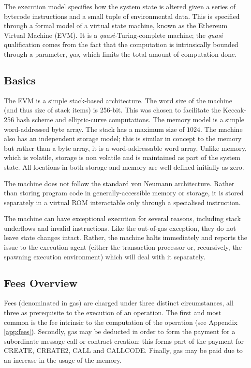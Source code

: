 \documentclass[9pt,oneside]{amsart}
\begin{document}
\begin{multicols}{2}
The execution model specifies how the system state is altered given a series of bytecode instructions and a small tuple of environmental data. This is specified through a formal model of a virtual state machine, known as the Ethereum Virtual Machine (EVM). It is a \textit{quasi-}Turing-complete machine; the \textit{quasi} qualification comes from the fact that the computation is intrinsically bounded through a parameter, \textit{gas}, which limits the total amount of computation done.

\subsection{Basics}

The EVM is a simple stack-based architecture. The word size of the machine (and thus size of stack items) is 256-bit. This was chosen to facilitate the Keccak-256 hash scheme and elliptic-curve computations. The memory model is a simple word-addressed byte array. The stack has a maximum size of $1024$. The machine also has an independent storage model; this is similar in concept to the memory but rather than a byte array, it is a word-addressable word array. Unlike memory, which is volatile, storage is non volatile and is maintained as part of the system state. All locations in both storage and memory are well-defined initially as zero.

The machine does not follow the standard von Neumann architecture. Rather than storing program code in generally-accessible memory or storage, it is stored separately in a virtual ROM interactable only through a specialised instruction.

The machine can have exceptional execution for several reasons, including stack underflows and invalid instructions. Like the out-of-gas exception, they do not leave state changes intact. Rather, the machine halts immediately and reports the issue to the execution agent (either the transaction processor or, recursively, the spawning execution environment) which will deal with it separately.

\subsection{Fees Overview}

Fees (denominated in gas) are charged under three distinct circumstances, all three as prerequisite to the execution of an operation. The first and most common is the fee intrinsic to the computation of the operation (see Appendix \ref{app:fees}). Secondly, gas may be deducted in order to form the payment for a subordinate message call or contract creation; this forms part of the payment for {\small CREATE}, {\small CREATE2}, {\small CALL} and {\small CALLCODE}. Finally, gas may be paid due to an increase in the usage of the memory.


\end{multicols}
\end{document}

